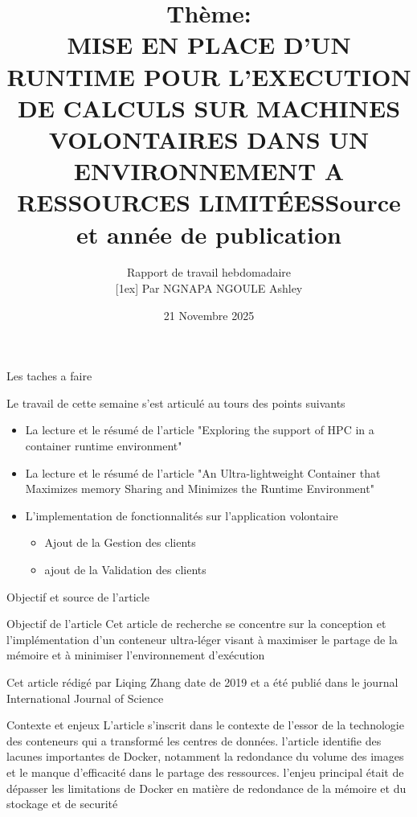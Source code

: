 \documentclass[9pt]{beamer}
\title[Title Short]{Thème: \\ MISE EN PLACE D'UN RUNTIME POUR L'EXECUTION DE CALCULS SUR MACHINES VOLONTAIRES DANS UN ENVIRONNEMENT A RESSOURCES LIMITÉES}
\author[Name]{ Rapport de travail hebdomadaire\texorpdfstring{\\}{and}[1ex] {\small Par NGNAPA NGOULE Ashley}}
\institute[SUT]{Department d'informatique, Université de Yaoundé 1}
\date[]{21 Novembre 2025}
\begin{document}
\Front
\overview
\begin{frame}{Les taches a faire}

Le travail de cette semaine s'est articulé au tours des points suivants
    \begin{itemize}[<+->]
        \vspace{5mm}
        \item La lecture et le résumé de l'article "Exploring the support of HPC in a container runtime environment"
        \vspace{5mm}
        \item La lecture et le résumé de l'article "An Ultra-lightweight Container that Maximizes memory Sharing and Minimizes the Runtime Environment"
        \vspace{5mm}
        \item L'implementation de fonctionnalités sur l'application volontaire
            \begin{itemize}[<.->]
                \item Ajout de la Gestion des clients
                \item ajout de la Validation des clients
                \end{itemize}        
    \end{itemize}
\end{frame}
\begin{frame}{Objectif et source de l'article}
    \begin{block}{Objectif de l'article}
Cet article de recherche se concentre sur la conception et l'implémentation d'un conteneur ultra-léger visant à maximiser le partage de la mémoire et à minimiser l'environnement d'exécution
    \end{block}
    \title{Source et année de publication} 
    Cet article rédigé par Liqing Zhang date de 2019 et a été publié dans le journal International Journal of Science 
\end{frame}


\begin{frame}{Contexte et enjeux}
 L'article s'inscrit dans le contexte de l'essor de la technologie des conteneurs qui a transformé les centres de données. l'article identifie des lacunes importantes de Docker, notamment la redondance du volume des images et le manque d'efficacité dans le partage des ressources. 
  l'enjeu principal était de dépasser les limitations de Docker en matière de redondance de la mémoire et du stockage et de securité
\end{frame}
\end{document}
